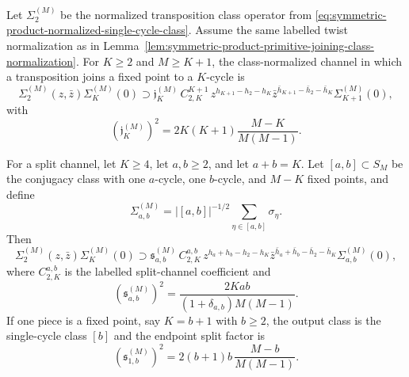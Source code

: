 \begin{lemma}
\label{lem:symmetric-product-transposition-join-split-factors}
Let \(\Sigma_2^{(M)}\) be the normalized transposition class operator from
\eqref{eq:symmetric-product-normalized-single-cycle-class}.  Assume the same
labelled twist normalization as in
Lemma~\ref{lem:symmetric-product-primitive-joining-class-normalization}.
For \(K\ge2\) and \(M\ge K+1\), the class-normalized channel in which a
transposition joins a fixed point to a \(K\)-cycle is
\begin{equation}
  \Sigma_2^{(M)}(z,\bar z)\Sigma_K^{(M)}(0)
  \supset
  \mathfrak j_K^{(M)}\,C_{2,K}^{K+1}\,
  z^{h_{K+1}-h_2-h_K}
  \bar z^{\bar h_{K+1}-\bar h_2-\bar h_K}
  \Sigma_{K+1}^{(M)}(0),
  \label{eq:symmetric-product-transposition-join-channel}
\end{equation}
with
\begin{equation}
  \left(\mathfrak j_K^{(M)}\right)^2
  =
  2K(K+1)\frac{M-K}{M(M-1)}.
  \label{eq:symmetric-product-transposition-join-factor}
\end{equation}

For a split channel, let \(K\ge4\), let \(a,b\ge2\), and let \(a+b=K\).  Let
\([a,b]\subset S_M\) be the conjugacy class with one \(a\)-cycle, one
\(b\)-cycle, and \(M-K\) fixed points, and define
\[
  \Sigma_{a,b}^{(M)}
  =
  |[a,b]|^{-1/2}\sum_{\eta\in[a,b]}\sigma_\eta .
\]
Then
\begin{equation}
  \Sigma_2^{(M)}(z,\bar z)\Sigma_K^{(M)}(0)
  \supset
  \mathfrak s_{a,b}^{(M)}\,C_{2,K}^{a,b}\,
  z^{h_a+h_b-h_2-h_K}
  \bar z^{\bar h_a+\bar h_b-\bar h_2-\bar h_K}
  \Sigma_{a,b}^{(M)}(0),
  \label{eq:symmetric-product-transposition-split-channel}
\end{equation}
where \(C_{2,K}^{a,b}\) is the labelled split-channel coefficient and
\begin{equation}
  \left(\mathfrak s_{a,b}^{(M)}\right)^2
  =
  \frac{2Kab}{(1+\delta_{a,b})M(M-1)} .
  \label{eq:symmetric-product-transposition-split-factor}
\end{equation}
If one piece is a fixed point, say \(K=b+1\) with \(b\ge2\), the output class
is the single-cycle class \([b]\) and the endpoint split factor is
\begin{equation}
  \left(\mathfrak s_{1,b}^{(M)}\right)^2
  =
  2(b+1)b\,\frac{M-b}{M(M-1)}.
  \label{eq:symmetric-product-transposition-endpoint-split-factor}
\end{equation}
\end{lemma}


